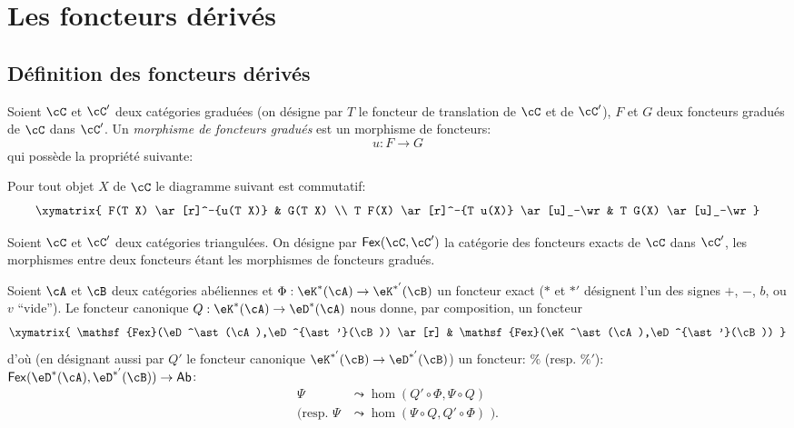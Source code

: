 \section{Les foncteurs dérivés}\label{VIII:4}










\subsection{Définition des foncteurs dérivés}\label{VIII:4-1}





\begin{definition}\label{VIII:4-1-1}
Soient $\cC$ et $\cC'$ deux catégories graduées (on désigne par $T$ le 
foncteur de translation de $\cC$ et de $\cC'$), $F$ et $G$ deux foncteurs 
gradués de $\cC$ dans $\cC'$. Un \emph{morphisme de foncteurs gradués} est 
un morphisme de foncteurs: 
\[
  u:F\to G 
\]
qui possède la propriété suivante: 

Pour tout objet $X$ de $\cC$ le diagramme suivant est commutatif: 
\[\xymatrix{
  F(T X) \ar[r]^-{u(T X)} 
    & G(T X) \\
  T F(X) \ar[r]^-{T u(X)} \ar[u]_-\wr 
    & T G(X) \ar[u]_-\wr 
}\]
\end{definition}

Soient $\cC$ et $\cC'$ deux catégories triangulées. On désigne par 
$\mathsf{Fex}(\cC,\cC')$ la catégorie des foncteurs exacts de $\cC$ dans 
$\cC'$, les morphismes entre deux foncteurs étant les morphismes de foncteurs 
gradués. 

Soient $\cA$ et $\cB$ deux catégories abéliennes et 
$\Phi:\eK^\ast(\cA)\to \eK^{\ast'}(\cB)$ un foncteur exact ($\ast$ et $\ast'$ 
désignent l'un des signes $+$, $-$, $b$, ou $v$ ``vide''). Le foncteur 
canonique $Q:\eK^\ast(\cA)\to \eD^\ast(\cA)$ nous donne, par composition, un 
foncteur 
\[\xymatrix{
  \mathsf{Fex}(\eD^\ast(\cA),\eD^{\ast'}(\cB)) \ar[r] 
    & \mathsf{Fex}(\eK^\ast(\cA),\eD^{\ast'}(\cB)) 
}\]
d'où (en désignant aussi par $Q'$ le foncteur canonique 
$\eK^{\ast'}(\cB) \to \eD^{\ast'}(\cB)$) un foncteur: 
$\%$ (resp. $\%'$): 
$\mathsf{Fex}(\eD^\ast(\cA),\eD^{\ast'}(\cB)) \to \mathsf{Ab}$: 
\begin{align*}
  \Psi  &\leadsto \hom(Q'\circ \Phi,\Psi\circ Q) \\
  (\text{resp. }\Psi &\leadsto \hom(\Psi\circ Q,Q'\circ \Phi)\text{ ).} 
\end{align*}





